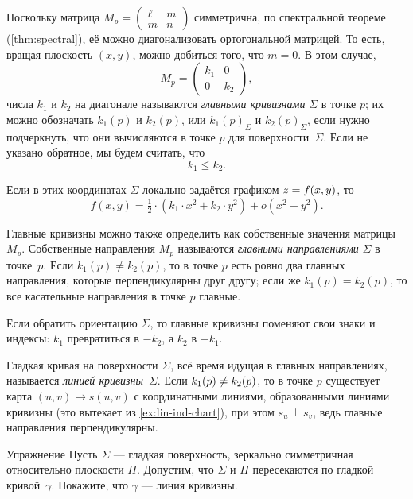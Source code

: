 Поскольку матрица $M_p=\left(\begin{smallmatrix}
 \ell
 &m
 \\
 m
 &n
 \end{smallmatrix}\right)$ 
симметрична, по спектральной теореме (\ref{thm:spectral}), её можно диагонализовать ортогональной матрицей.
То есть, вращая плоскость $(x,y)$, можно добиться того, что $m=0$.
В этом случае,
\[M_p=\begin{pmatrix}
 k_1
 &0
 \\
 0
 &k_2
 \end{pmatrix},
\]
числа $k_1$ и $k_2$  на диагонале называются \emph{главными кривизнами} $\Sigma$ в точке $p$;
их можно обозначать $k_1(p)$ и $k_2(p)$, или $k_1(p)_\Sigma$ и $k_2(p)_\Sigma$, если нужно подчеркнуть, что они вычисляются в точке $p$ для поверхности~$\Sigma$.
Если не указано обратное, мы будем считать, что 
\[k_1\le k_2.\]

{\sloppy

Если в этих координатах $\Sigma$ локально задаётся графиком $z\z=f(x,y)$, то 
\[f(x,y)=\tfrac12\cdot(k_1\cdot x^2+k_2\cdot y^2)+o(x^2+y^2).\]

}

Главные кривизны можно также определить как собственные значения матрицы $M_p$.
Собственные направления $M_p$ называются {}\emph{главными направлениями} $\Sigma$ в точке~$p$.
Если $k_1(p)\ne k_2(p)$, то в точке $p$ есть ровно два главных направления, которые перпендикулярны друг другу;
если же $k_1(p) = k_2(p)$, то все касательные направления в точке $p$ главные.

Если обратить ориентацию $\Sigma$, то главные кривизны поменяют свои знаки и индексы:
$k_1$ превратиться в $-k_2$, а $k_2$ в $-k_1$.

Гладкая кривая на поверхности $\Sigma$, всё время идущая в главных направлениях, называется \emph{линией кривизны}~$\Sigma$.
Если $k_1(p)\z\ne k_2(p)$, то в точке $p$ существует карта $(u,v)\mapsto s(u,v)$ с координатными линиями, образованными линиями кривизны (это вытекает из \ref{ex:lin-ind-chart}), при этом $s_u\perp s_v$, ведь главные направления перпендикулярны.

\begin{thm}{Упражнение}\label{ex:line-of-curvature}
Пусть $\Sigma$ --- гладкая поверхность, зеркально симметричная относительно плоскости $\Pi$.
Допустим, что $\Sigma$ и $\Pi$ пересекаются по гладкой кривой~$\gamma$.
Покажите, что $\gamma$ --- линия кривизны.
\end{thm}


